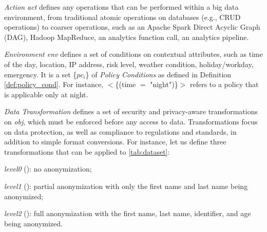       \textit{Action act} defines any operations that can be performed within a big data environment, from traditional atomic operations on databases (e.g., CRUD operations) to coarser operations, such as an Apache Spark Direct Acyclic Graph (DAG), Hadoop MapReduce, an analytics function call, an analytics pipeline.

      \textit{Environment env} defines a set of conditions on contextual attributes, such as time of the day, location, IP address, risk level, weather condition, holiday/workday, emergency. It is a set \{$pc_i$\} of \emph{Policy Conditions} as defined in Definition \ref{def:policy_cond}. For instance, $<$\{(time $=$ "night")\}$>$ refers to a policy that is applicable only at night.

      \textit{Data Transformation \TP} defines a set of security and privacy-aware transformations on \textit{obj}, which must be enforced before any access to data. Transformations focus on data protection, as well as compliance to regulations and standards, in addition to simple format conversions. For instance, let us define three transformations that can be applied to \cref{tab:dataset}:
      \begin{enumerate*}[label=\roman*)]
        \item \emph{level0} (): no anonymization;
        \item \emph{level1} (): partial anonymization with only the first name and last name being anonymized;
        \item \emph{level2} (): full anonymization with the first name, last name, identifier, and age being anonymized.
      \end{enumerate*}


